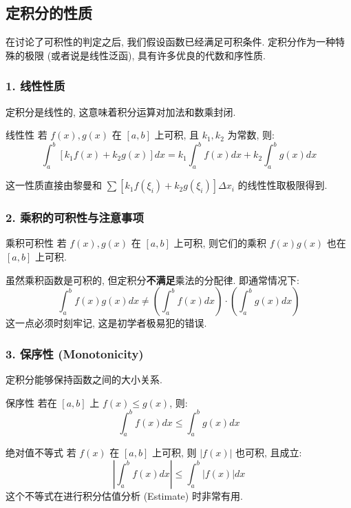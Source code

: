 \documentclass[a4paper,12pt]{ctexart}
\begin{document}
\subsection{定积分的性质}

在讨论了可积性的判定之后, 我们假设函数已经满足可积条件. 定积分作为一种特殊的极限 (或者说是线性泛函), 具有许多优良的代数和序性质.

\subsubsection{1. 线性性质}
定积分是线性的, 这意味着积分运算对加法和数乘封闭.

\begin{mythm}{线性性}{}
若 $f(x), g(x)$ 在 $[a,b]$ 上可积, 且 $k_1, k_2$ 为常数, 则:
$$
\int_a^b [k_1 f(x) + k_2 g(x)] dx = k_1 \int_a^b f(x) dx + k_2 \int_a^b g(x) dx
$$
\end{mythm}
这一性质直接由黎曼和 $\sum [k_1 f(\xi_i) + k_2 g(\xi_i)] \Delta x_i$ 的线性性取极限得到.

\subsubsection{2. 乘积的可积性与注意事项}

\begin{mythm}{乘积可积性}{}
若 $f(x), g(x)$ 在 $[a,b]$ 上可积, 则它们的乘积 $f(x)g(x)$ 也在 $[a,b]$ 上可积.
\end{mythm}

\begin{mywarning}
虽然乘积函数是可积的, 但定积分\textbf{不满足}乘法的分配律. 即通常情况下:
$$
\int_a^b f(x)g(x) dx \neq \left( \int_a^b f(x) dx \right) \cdot \left( \int_a^b g(x) dx \right)
$$
这一点必须时刻牢记, 这是初学者极易犯的错误.
\end{mywarning}

\subsubsection{3. 保序性 (Monotonicity)}
定积分能够保持函数之间的大小关系.

\begin{mythm}{保序性}{}
若在 $[a,b]$ 上 $f(x) \le g(x)$, 则:
$$
\int_a^b f(x) dx \le \int_a^b g(x) dx
$$
\end{mythm}

\begin{mycor}{绝对值不等式}{}
若 $f(x)$ 在 $[a,b]$ 上可积, 则 $|f(x)|$ 也可积, 且成立:
$$
\left| \int_a^b f(x) dx \right| \le \int_a^b |f(x)| dx
$$
这个不等式在进行积分估值分析 (Estimate) 时非常有用.
\end{mycor}
\end{document}
